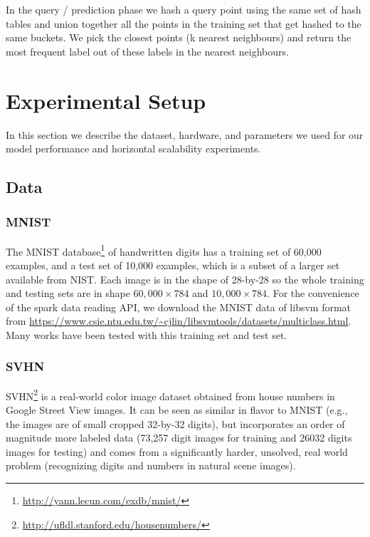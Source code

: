 \documentclass[letterpaper,twocolumn,10pt]{article}
\theoremstyle{definition}
\begin{document}
In the query / prediction phase we hash a query point using the same set of hash tables and union 
together all the points in the training set that get hashed to the same buckets. We pick the closest 
points (k nearest neighbours) and return the most frequent label out of these labels in the nearest 
neighbours.

\section{Experimental Setup}

In this section we describe the dataset, hardware, and parameters we used for our model performance 
and horizontal scalability experiments.

\subsection{Data}
\subsubsection{MNIST}
The MNIST database\footnote{\url{http://yann.lecun.com/exdb/mnist/}}\cite{lecun1998gradient} of handwritten digits has a training set of 60,000 examples, and a test set of 10,000 examples, which is a subset of a larger set available from NIST. Each image is in the shape of 28-by-28 so the whole training and testing sets are in shape $60,000 \times 784$ and $10,000 \times 784$. For the convenience of the spark data reading API, we download the MNIST data of libsvm format from \url{https://www.csie.ntu.edu.tw/~cjlin/libsvmtools/datasets/multiclass.html}.
Many works have been tested with this training set and test 
set\cite{lecun1998gradient,ciresan2011flexible,jarrett2009best}.

\subsubsection{SVHN}
SVHN\footnote{\url{http://ufldl.stanford.edu/housenumbers/}}\cite{netzer2011reading} is a real-world color image dataset obtained from house numbers in Google
Street View images. It can be seen as similar in flavor to MNIST (e.g., the images are of small cropped 32-by-32 digits), but incorporates an order of magnitude more labeled data (73,257 digit images for training and 26032 digits images for testing) and comes from a significantly harder, unsolved, real world problem (recognizing digits and numbers in natural scene images). 
\end{document}
